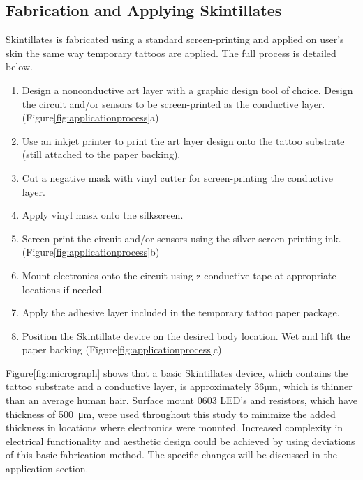 \documentclass{sigchi}
\begin{document}
\subsection{Fabrication and Applying Skintillates}
Skintillates is fabricated using a standard screen-printing and applied on user’s skin the same way temporary tattoos are applied. The full process is detailed below. 
\begin{enumerate}
  \item Design a nonconductive art layer with a graphic design tool of choice. Design the circuit and/or sensors to be screen-printed as the conductive layer. (Figure\ref{fig:applicationprocess}a)
  \item Use an inkjet printer to print the art layer design onto the tattoo substrate (still attached to the paper backing). 
  \item Cut a negative mask with vinyl cutter for screen-printing the conductive layer. 
  \item Apply vinyl mask onto the silkscreen. 
  \item Screen-print the circuit and/or sensors using the silver screen-printing ink.(Figure\ref{fig:applicationprocess}b)
  \item Mount electronics onto the circuit using z-conductive tape at appropriate locations if needed.   
  \item Apply the adhesive layer included in the temporary tattoo paper package. 
  \item Position the Skintillate device on the desired body location. Wet and lift the paper backing (Figure\ref{fig:applicationprocess}c)
\end{enumerate}
Figure\ref{fig:micrograph} shows that a basic Skintillates device, which contains the tattoo substrate and a conductive layer, is approximately 36µm, which is thinner than an average human hair. Surface mount 0603 LED's and resistors, which have thickness of  \SI{500}{\micro\metre}, were used throughout this study to minimize the added thickness in locations where electronics were mounted. Increased complexity in electrical functionality and aesthetic design could be achieved by using deviations of this basic fabrication method. The specific changes will be discussed in the application section. 
\end{document}
